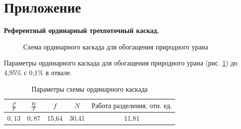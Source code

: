 \chapter*{Приложение}             %
\noindent

\renewcommand{\thefigure}{A\arabic{figure}}
\setcounter{figure}{0}
\renewcommand{\thetable}{A\arabic{figure}}
\setcounter{table}{0}

\textbf{Референтный ординарный трехпоточный каскад.}

\begin{figure}[ht]
  \caption{Схема ординарного каскада для обогащения природного урана}\label{uranfN}
\end{figure}

Параметры ординарного каскада для обогащения природного урана (рис. \ref{uranfN}) до 4,95\% с 0,1\% в отвале.

\begin{table}[ht]
    \centering
    \normalsize\begin{tabulary}{1.0\textwidth}{|c|c|c|c|c|}
        \hline $\frac{P}{F}$ & $\frac{W}{F}$ & $f$ & $N$ & $\textit{Работа разделения, отн. ед.}$\\
        \hline $0,13$ & $0,87$ & 15,64 & 30,41 & 11,81\\\hline
    \end{tabulary}
\caption{Параметры схемы ординарного каскада}\label{ordninary495}
\end{table}















